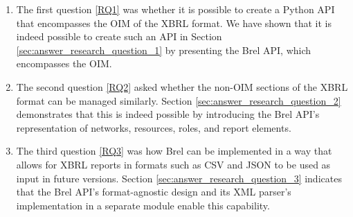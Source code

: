 \begin{enumerate}
    \item The first question \ref{RQ1} was whether it is possible to create a Python API that encompasses the OIM of the XBRL format.
    We have shown that it is indeed possible to create such an API in Section \ref{sec:answer_research_question_1}
    by presenting the Brel API, which encompasses the OIM.
    \item The second question \ref{RQ2} asked whether the non-OIM sections of the XBRL format can be managed similarly.
    Section \ref{sec:answer_research_question_2} demonstrates that this is indeed possible
    by introducing the Brel API's representation of networks, resources, roles, and report elements.
    \item The third question \ref{RQ3} was how Brel can be implemented in a way that allows for XBRL reports in
    formats such as CSV and JSON to be used as input in future versions.
    Section \ref{sec:answer_research_question_3} indicates that the Brel API's format-agnostic design
    and its XML parser's implementation in a separate module enable this capability.
\end{enumerate}

